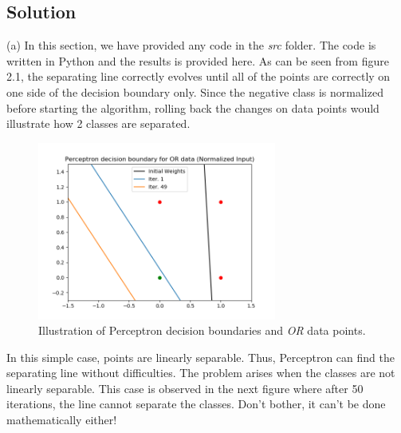 \documentclass[12pt]{article}
\numberwithin{equation}{section}
\numberwithin{table}{section}
\numberwithin{figure}{section}
\begin{document}
\subsection*{Solution}
(a) In this section, we have provided any code in the \textit{src} folder. The code is written in Python and the results is provided here. As can be seen from figure 2.1, the separating line correctly evolves until all of the points are correctly on one side of the decision boundary only. Since the negative class is normalized before starting the algorithm, rolling back the changes on data points would illustrate how 2 classes are separated.
\begin{figure}[!h]\centering
	\includegraphics[width=0.7\textwidth]{Percept1.png}
	\caption{Illustration of Perceptron decision boundaries and \textit{OR} data points.}
	\label{pl1}
\end{figure}
In this simple case, points are linearly separable. Thus, Perceptron can find the separating line without difficulties. The problem arises when the classes are not linearly separable. This case is observed in the next figure where after 50 iterations, the line cannot separate the classes. Don't bother, it can't be done mathematically either!
\end{document}
